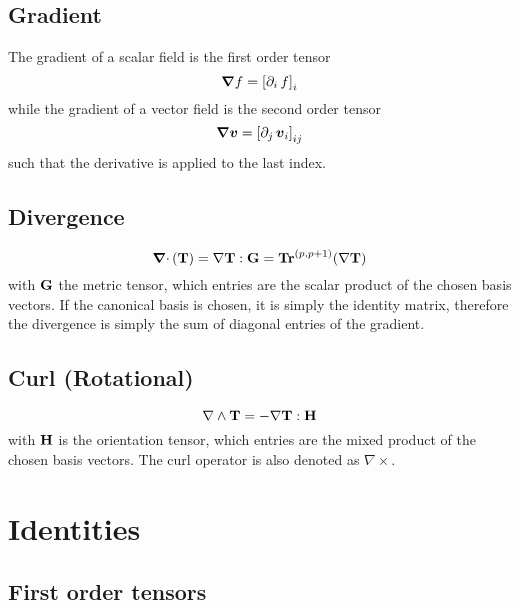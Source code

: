 \subsection{Gradient}

The gradient of a scalar field is the first order tensor
\begin{equation}
{\boldsymbol\nabla} f = \left[\partial_{i}\, f\right]_i
\end{equation}
while the gradient of a vector field is the second order tensor
\begin{equation}
{\boldsymbol\nabla} {{\boldsymbol v}} = \left[\partial_{j}\, {{\boldsymbol v}}_i\right]_{ij}
\end{equation}
such that the derivative is applied to the last index.

\subsection{Divergence}
\begin{equation}
{\boldsymbol\nabla\cdot\,}({\mathbf T}) = \nabla{\mathbf T} : {\mathbf G} = {\mathbf{Tr}}^{(p,p+1)}(\nabla{\mathbf T})
\end{equation}
with ${\mathbf G}$ the metric tensor, which entries are the scalar product of the chosen basis vectors.
If the canonical basis is chosen, it is simply the identity matrix, therefore the divergence is simply the sum of diagonal entries of the gradient.

\subsection{Curl (Rotational)}
\begin{equation}
\nabla\wedge{\mathbf T} = -\nabla{\mathbf T} : {\mathbf H}
\end{equation}
with ${\mathbf H}$ is the orientation tensor, which entries are the mixed product of the chosen basis vectors. The curl operator is also denoted as $\nabla\times$.

\section{Identities}

\subsection{First order tensors}

